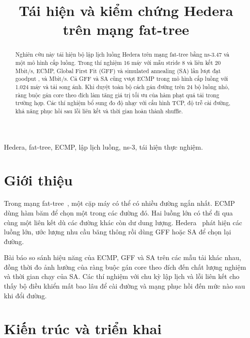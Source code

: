 \documentclass[conference,a4paper]{IEEEtran}
\title{Tái hiện và kiểm chứng Hedera trên mạng fat-tree}
\author{\IEEEauthorblockN{Đoàn Việt Đức}}
\begin{document}
\maketitle

\begin{abstract}
Nghiên cứu này tái hiện bộ lập lịch luồng Hedera trên mạng fat-tree bằng ns-3.47 và một mô hình cấp luồng. Trong thí nghiệm 16 máy với mẫu stride 8 và liên kết 20 Mbit/s, ECMP, Global First Fit (GFF) và simulated annealing (SA) lần lượt đạt goodput \CompactEcmp, \CompactGff{} và \CompactSa{} Mbit/s. Cả GFF và SA cũng vượt ECMP trong mô hình cấp luồng với 1.024 máy và tải song ánh. Khi duyệt toàn bộ cách gán đường trên 24 bộ luồng nhỏ, ràng buộc gán core theo đích làm tăng giá trị tối ưu của hàm phạt quá tải trong \RestrictionCases{} trường hợp. Các thí nghiệm bổ sung đo độ nhạy với cấu hình TCP, độ trễ cài đường, khả năng phục hồi sau lỗi liên kết và thời gian hoàn thành shuffle.
\end{abstract}

\begin{IEEEkeywords}
Hedera, fat-tree, ECMP, lập lịch luồng, ns-3, tái hiện thực nghiệm.
\end{IEEEkeywords}

\section{Giới thiệu}
Trong mạng fat-tree~\cite{fattree}, một cặp máy có thể có nhiều đường ngắn nhất. ECMP dùng hàm băm để chọn một trong các đường đó. Hai luồng lớn có thể đi qua cùng một liên kết dù các đường khác còn dư dung lượng. Hedera~\cite{hedera} phát hiện các luồng lớn, ước lượng nhu cầu băng thông rồi dùng GFF hoặc SA để chọn lại đường.

Bài báo so sánh hiệu năng của ECMP, GFF và SA trên các mẫu tải khác nhau, đồng thời đo ảnh hưởng của ràng buộc gán core theo đích đến chất lượng nghiệm và thời gian chạy của SA. Các thí nghiệm với chu kỳ lập lịch và lỗi liên kết cho thấy bộ điều khiển mất bao lâu để cài đường và mạng phục hồi đến mức nào sau khi đổi đường.

\section{Kiến trúc và triển khai}
\end{document}
